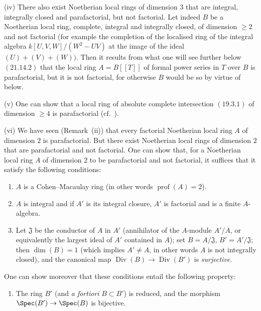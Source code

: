 \begin{example}[21.13.9]
(iv) There also exist Noetherian local rings of dimension $3$ that are integral, integrally closed and parafactorial, but not factorial.
Let indeed $B$ be a Noetherian local ring, complete, integral and integrally closed, of dimension $\geq 2$ and not factorial (for example the completion of the localised ring of the integral algebra $k[U,V,W]/(W^2-UV)$ at the image of the ideal $(U)+(V)+(W))$.
Then it results from what one will see further below $(21.14.2)$ that the local ring $A=B[[T]]$ of formal power series in $T$ over $B$ is parafactorial, but it is not factorial, for otherwise $B$ would be so by virtue of  below.

(v) One can show that a local ring of absolute complete intersection $(19.3.1)$ of dimension $\geq 4$ is parafactorial (cf.\ \cite[XI, 3.13~(i)]{41}).

(vi) We have seen (Remark~(ii)) that every factorial Noetherian local ring $A$ of dimension $2$ is parafactorial.
But there exist Noetherian local rings of dimension $2$ that are parafactorial and not factorial.
One can show that, for a Noetherian local ring $A$ of dimension $2$ to be parafactorial and not factorial, it suffices that it satisfy the following conditions:
\begin{enumerate}
  \item[$1\textsuperscript{o}$] $A$ is a Cohen--Macaulay ring (in other words $\operatorname{prof}(A)=2$).
  \item[$2\textsuperscript{o}$] $A$ is integral and if $A'$ is its integral closure, $A'$ is factorial and is a finite $A$-algebra.
  \item[$3\textsuperscript{o}$] Let $\mathfrak{J}$ be the conductor of $A$ in $A'$ (annihilator of the $A$-module $A'/A$, or equivalently the largest ideal of $A'$ contained in $A$); set $B=A/\mathfrak{J}$, $B'=A'/\mathfrak{J}$; then $\dim(B)=1$ (which implies $A'\neq A$, in other words $A$ is not integrally closed), and the canonical map $\operatorname{Div}(B)\to\operatorname{Div}(B')$  is \emph{surjective}.
\end{enumerate}
One can show moreover that these conditions entail the following property:
\begin{enumerate}
  \item[$4\textsuperscript{o}$] The ring $B'$ (and \emph{a fortiori} $B\subset B'$) is reduced, and the morphism $\Spec(B')\to\Spec(B)$ is bijective.
\end{enumerate}


\end{example}
